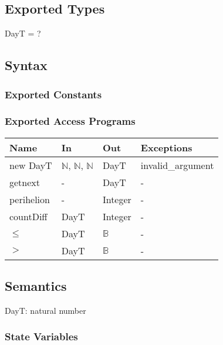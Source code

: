 \documentclass[12pt, titlepage]{article}
\begin{document}
\subsection{Exported Types}

DayT = ? \\

\subsection{Syntax}

\subsubsection{Exported Constants}


\subsubsection{Exported Access Programs}

\begin{center}
\begin{tabular}{p{3cm} p{5cm} p{4cm} p{2cm}}
\hline
\textbf{Name} & \textbf{In} & \textbf{Out} & \textbf{Exceptions} \\
\hline
new DayT& $\mathbb{N}$, $\mathbb{N}$, $\mathbb{N}$ & DayT & invalid\_argument \\
getnext &  -  & DayT & - \\
perihelion &  -  & Integer & - \\
countDiff &  DayT  & Integer & - \\
$\leq$ &  DayT  & $\mathbb{B}$ & - \\
$>$ &  DayT  & $\mathbb{B}$ & - \\
\hline
\end{tabular}
\end{center}

 

\subsection{Semantics}
DayT: natural number

\subsubsection{State Variables}
\end{document}
